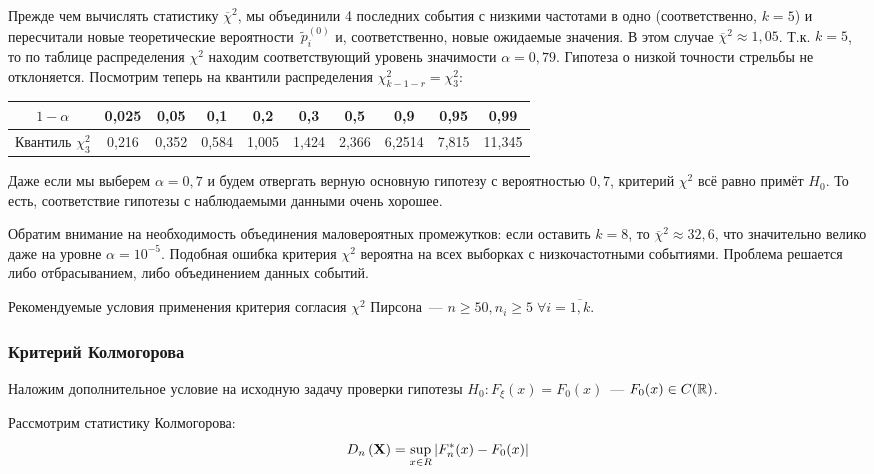 \begin{exmp}
    Прежде чем вычислять статистику $\overline{\chi}^{2}$, мы объединили 4 последних события с низкими частотами в одно (соответственно, $k=5$) 
    и пересчитали новые теоретические вероятности~$\tilde{p}_i^{(0)}$ и, соответственно, новые ожидаемые значения. 
    В этом случае $\overline{\chi}^{2} \approx 1{,}05$. 
    Т.к. $k=5$, то по таблице распределения $\chi^{2}$ находим соответствующий уровень значимости $\alpha = 0{,}79$. 
    Гипотеза о низкой точности стрельбы не отклоняется.
    Посмотрим теперь на квантили распределения $\chi^{2}_{k-1-r} = \chi^{2}_{3}$:
    \begin{center}
        \begin{tabular}{|c|c|c|c|c|c|c|c|c|c|}
            \hline $1 - \alpha$         & 0{,}025 & 0{,}05  & 0{,}1   & 0{,}2   & 0{,3}   & 0{,}5  & 0{,}9  & 0{,}95  & 0{,}99 \\
            \hline Квантиль $\chi^{2}_{3}$ & 0{,}216 & 0{,}352 & 0{,}584 & 1{,}005 & 1{,}424 & 2{,}366 & 6{,}2514 & 7{,}815 & 11{,}345 \\
            \hline
        \end{tabular}
    \end{center}
    Даже если мы выберем $\alpha = 0{,}7$ и будем отвергать верную основную гипотезу с вероятностью $0{,}7$, критерий $\chi^2$ всё равно примёт $H_0$.
    То есть, соответствие гипотезы с наблюдаемыми данными очень хорошее.
    
    Обратим внимание на необходимость объединения маловероятных промежутков: если оставить $k = 8$, то $\overline{\chi}^{2} \approx 32{,}6$, 
    что значительно велико даже на уровне $\alpha = 10^{-5}$. 
    Подобная ошибка критерия $\chi^{2}$ вероятна на всех выборках с низкочастотными событиями. 
    Проблема решается либо отбрасыванием, либо объединением данных событий. %
\end{exmp}
Рекомендуемые условия применения критерия согласия $\chi^2$ Пирсона~--- $n \geqslant 50, n_i \geqslant 5 \; \forall i = \overline{1, k}$.
    
    
\subsubsection{Критерий Колмогорова}
Наложим дополнительное условие на исходную задачу проверки гипотезы $H_0\colon F_{\xi}(x) = F_0(x)$~--- $F_{0}(x) \in C(\mathbb{R})$.

Рассмотрим статистику Колмогорова:
\begin{equation*}
    D_{n}\left(\mathbf{X}\right)=\sup\limits_{x \in R}\left|F_{n}^{*}(x)-F_{0}(x)\right|
\end{equation*}

